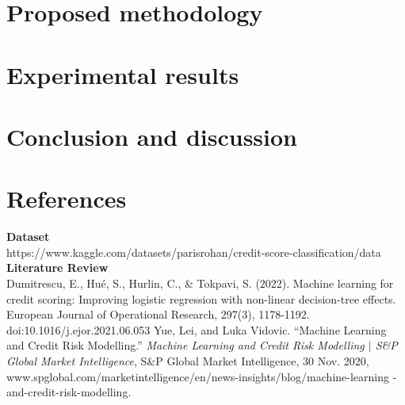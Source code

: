 \documentclass{article}
\begin{document}
\section*{Proposed methodology}

\newpage
\section*{Experimental results}

\newpage
\section*{Conclusion and discussion}

\newpage
\section*{References}
\textbf{Dataset}\\
https://www.kaggle.com/datasets/parisrohan/credit-score-classification/data
\vspace{5mm}\newline
\textbf{Literature Review}\\
Dumitrescu, E., Hué, S., Hurlin, C., \& Tokpavi, S. (2022). 
Machine learning for credit scoring: Improving logistic regression 
with non-linear decision-tree effects. European Journal of Operational 
Research, 297(3), 1178-1192. doi:10.1016/j.ejor.2021.06.053
\vspace{5mm}\newline
Yue, Lei, and Luka Vidovic. “Machine Learning and Credit Risk Modelling.”
 \textit{Machine Learning and Credit Risk Modelling $\vert$ S\&P Global Market Intelligence}, 
 S\&P Global Market Intelligence, 30 Nov. 2020, 
 www.spglobal.com/marketintelligence/en/news-insights/blog/machine-learning
 -and-credit-risk-modelling. 
\end{document}
